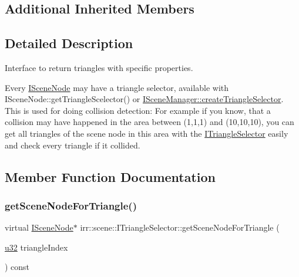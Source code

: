 \subsection*{Additional Inherited Members}


\subsection{Detailed Description}
Interface to return triangles with specific properties. 

Every \hyperlink{classirr_1_1scene_1_1ISceneNode}{I\+Scene\+Node} may have a triangle selector, available with I\+Scene\+Node\+::get\+Triangle\+Scelector() or \hyperlink{classirr_1_1scene_1_1ISceneManager_a266625379b1558e9be1dc062ea4e71f7}{I\+Scene\+Manager\+::create\+Triangle\+Selector}. This is used for doing collision detection\+: For example if you know, that a collision may have happened in the area between (1,1,1) and (10,10,10), you can get all triangles of the scene node in this area with the \hyperlink{classirr_1_1scene_1_1ITriangleSelector}{I\+Triangle\+Selector} easily and check every triangle if it collided. 

\subsection{Member Function Documentation}
\mbox{\label{classirr_1_1scene_1_1ITriangleSelector_a9b180f4d9e273a6c1cda9afeb3b1c98b}} 
\subsubsection{\texorpdfstring{get\+Scene\+Node\+For\+Triangle()}{getSceneNodeForTriangle()}}
{\footnotesize\ttfamily virtual \hyperlink{classirr_1_1scene_1_1ISceneNode}{I\+Scene\+Node}$\ast$ irr\+::scene\+::\+I\+Triangle\+Selector\+::get\+Scene\+Node\+For\+Triangle (\begin{DoxyParamCaption}\item[{\hyperlink{namespaceirr_a0416a53257075833e7002efd0a18e804}{u32}}]{triangle\+Index }\end{DoxyParamCaption}) const\hspace{0.3cm}{\ttfamily [pure virtual]}}




